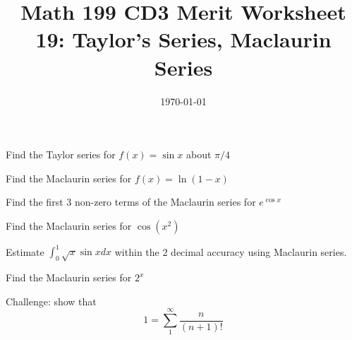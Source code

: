 
\usepackage{fullpage,amsmath,amssymb,amsthm}

\newcommand{\D}{\displaystyle}

\title{Math 199 CD3 Merit Worksheet 19: Taylor's Series, Maclaurin Series}
\date{\today}




\maketitle

\be
	\item Find the Taylor series for $f(x)= \sin x$ about $\pi/4$

	\vfill

	\item Find the Maclaurin series for $f(x)=\ln(1-x)$

	\vfill

	\item Find the first 3 non-zero terms of the Maclaurin series for $e^{\cos x}$

	\vfill
	\item Find the Maclaurin series for $\cos (x^2)$
	\vfill
	\newpage
	\item Estimate $\int_0^1\sqrt x \sin x dx$ within the 2 decimal accuracy using Maclaurin series. 
	\vfill

	\item Find the Maclaurin series for $2^x$
	\vfill

	\item Challenge: show that $$1=\sum_1^\infty\frac{n}{(n+1)!}$$
	\vfill

\ee

